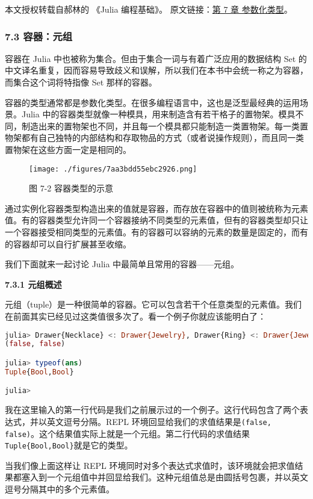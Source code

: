 
本文授权转载自郝林的 《Julia 编程基础》。 原文链接：\href{https://github.com/hyper0x/JuliaBasics/blob/master/book/ch07.md}{第 7 章 参数化类型}。


\subsubsection{7.3 容器：元组}

容器在 Julia 中也被称为集合。但由于集合一词与有着广泛应用的数据结构 Set 的中文译名重复，因而容易导致歧义和误解，所以我们在本书中会统一称之为容器，而集合这个词将特指像 Set 那样的容器。

容器的类型通常都是参数化类型。在很多编程语言中，这也是泛型最经典的运用场景。Julia 中的容器类型就像一种模具，用来制造含有若干格子的置物架。模具不同，制造出来的置物架也不同，并且每一个模具都只能制造一类置物架。每一类置物架都有自己独特的内部结构和存取物品的方式（或者说操作规则），而且同一类置物架在这些方面一定是相同的。
\begin{figure}[ht]
\centering
\texttt{[image: ./figures/7aa3bdd55ebc2926.png]}
\caption{图 7-2 容器类型的示意} \label{fig_JuC7S3_1}
\end{figure}

通过实例化容器类型构造出来的值就是容器，而存放在容器中的值则被统称为元素值。有的容器类型允许同一个容器接纳不同类型的元素值，但有的容器类型却只让一个容器接受相同类型的元素值。有的容器可以容纳的元素的数量是固定的，而有的容器却可以自行扩展甚至收缩。

我们下面就来一起讨论 Julia 中最简单且常用的容器——元组。

\textbf{7.3.1 元组概述 }

元组（tuple）是一种很简单的容器。它可以包含若干个任意类型的元素值。我们在前面其实已经见过这类值很多次了。看一个例子你就应该能明白了：
\begin{lstlisting}[language=julia]
julia> Drawer{Necklace} <: Drawer{Jewelry}, Drawer{Ring} <: Drawer{Jewelry}
(false, false)

julia> typeof(ans)
Tuple{Bool,Bool}

julia> 
\end{lstlisting}

我在这里输入的第一行代码是我们之前展示过的一个例子。这行代码包含了两个表达式，并以英文逗号分隔。REPL 环境回显给我们的求值结果是\verb|(false, false)|。这个结果值实际上就是一个元组。第二行代码的求值结果\verb|Tuple{Bool,Bool}|就是它的类型。

当我们像上面这样让 REPL 环境同时对多个表达式求值时，该环境就会把求值结果都塞入到一个元组值中并回显给我们。这种元组值总是由圆括号包裹，并以英文逗号分隔其中的多个元素值。

